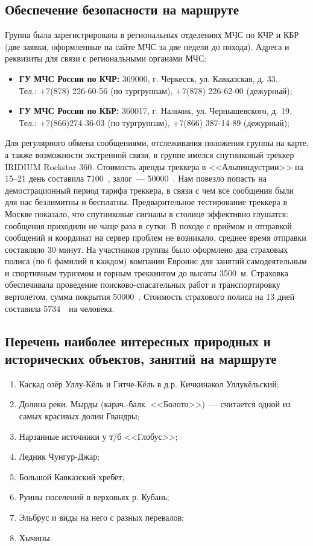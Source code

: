 \subsection{Обеспечение безопасности на маршруте}
Группа была зарегистрирована в региональных отделениях МЧС по КЧР и КБР (две заявки, оформленные на сайте МЧС за две недели до похода).
Адреса и реквизиты для связи с региональными органами МЧС:
\begin{itemize}
	\item \textbf{ГУ МЧС России по КЧР:} 369000, г. Черкесск, ул. Кавказская, д. 33.\\
	Тел.: +7(878) 226-60-56 (по тургруппам), +7(878) 226-62-00 (дежурный);
	
	\item \textbf{ГУ МЧС России по КБР:} 360017, г. Нальчик, ул. Чернышевского, д. 19.\\
	Тел.: +7(866)274-36-03 (по тургруппам), +7(866) 387-14-89 (дежурный);	
\end{itemize}
Для регулярного обмена сообщениями, отслеживания положения группы на карте, а также возможности экстренной связи, в группе имелся спутниковый треккер IRIDIUM Rockstar 360. Стоимость аренды треккера в <<Альпиндустрии>> на 15--21 день составила 7100~\faRub, залог~--- 50000~\faRub. Нам повезло попасть на демострационный период тарифа треккера, в связи с чем все сообщения были для нас безлимитны и бесплатны. Предварительное тестирование треккера в Москве показало, что спутниковые сигналы в столице эффективно глушатся: сообщения приходили не чаще раза в сутки. В походе с приёмом и отправкой сообщений и координат на сервер проблем не возникало, среднее время отправки составляло 30 минут.
На участников группы было оформлено два страховых полиса (по 6 фамилий в каждом) компании Евроинс для
занятий самодеятельным и спортивным туризмом и горным треккингом до высоты 3500~м. Страховка обеспечивала проведение поисково-спасательных работ и транспортировку вертолётом, сумма покрытия 50000~\faEur. Стоимость страхового полиса на 13 дней составила 5734~\faRub~на человека.

\subsection{Перечень наиболее интересных природных и исторических объектов, занятий на маршруте}
\begin{enumerate}[noitemsep,topsep=0pt,parsep=0pt,partopsep=0pt]
	\item Каскад озёр Уллу-Кёль и Гитче-Кёль в д.р. Кичкинакол Уллукёльский; 
	\item Долина реки. Мырды (карач.-балк. <<Болото>>)~--- считается одной из самых красивых долин Гвандры; 
	\item Нарзанные источники у т/б <<Глобус>>; 
	\item Ледник Чунгур-Джар; 
	\item Большой Кавказский хребет; 
	\item Руины поселений в верховьях р. Кубань; 
	\item Эльбрус и виды на него с разных перевалов;
	\item Хычины.
\end{enumerate}


